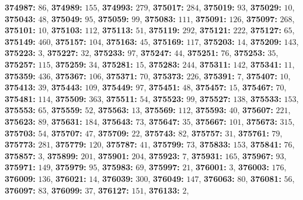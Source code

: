 \textsf{\bfseries 374987:} $86$, \textsf{\bfseries 374989:} $155$, \textsf{\bfseries 374993:} $279$, \textsf{\bfseries 375017:} $284$, \textsf{\bfseries 375019:} $93$, \textsf{\bfseries 375029:} $10$, \textsf{\bfseries 375043:} $48$, \textsf{\bfseries 375049:} $95$, \textsf{\bfseries 375059:} $99$, \textsf{\bfseries 375083:} $111$, \textsf{\bfseries 375091:} $126$, \textsf{\bfseries 375097:} $268$, \textsf{\bfseries 375101:} $10$, \textsf{\bfseries 375103:} $112$, \textsf{\bfseries 375113:} $51$, \textsf{\bfseries 375119:} $292$, \textsf{\bfseries 375121:} $222$, \textsf{\bfseries 375127:} $65$, \textsf{\bfseries 375149:} $460$, \textsf{\bfseries 375157:} $104$, \textsf{\bfseries 375163:} $45$, \textsf{\bfseries 375169:} $117$, \textsf{\bfseries 375203:} $14$, \textsf{\bfseries 375209:} $143$, \textsf{\bfseries 375223:} $3$, \textsf{\bfseries 375227:} $32$, \textsf{\bfseries 375233:} $97$, \textsf{\bfseries 375247:} $44$, \textsf{\bfseries 375251:} $76$, \textsf{\bfseries 375253:} $35$, \textsf{\bfseries 375257:} $115$, \textsf{\bfseries 375259:} $34$, \textsf{\bfseries 375281:} $15$, \textsf{\bfseries 375283:} $244$, \textsf{\bfseries 375311:} $142$, \textsf{\bfseries 375341:} $11$, \textsf{\bfseries 375359:} $436$, \textsf{\bfseries 375367:} $106$, \textsf{\bfseries 375371:} $70$, \textsf{\bfseries 375373:} $226$, \textsf{\bfseries 375391:} $7$, \textsf{\bfseries 375407:} $10$, \textsf{\bfseries 375413:} $39$, \textsf{\bfseries 375443:} $109$, \textsf{\bfseries 375449:} $97$, \textsf{\bfseries 375451:} $48$, \textsf{\bfseries 375457:} $15$, \textsf{\bfseries 375467:} $70$, \textsf{\bfseries 375481:} $114$, \textsf{\bfseries 375509:} $363$, \textsf{\bfseries 375511:} $54$, \textsf{\bfseries 375523:} $99$, \textsf{\bfseries 375527:} $138$, \textsf{\bfseries 375533:} $153$, \textsf{\bfseries 375553:} $65$, \textsf{\bfseries 375559:} $52$, \textsf{\bfseries 375563:} $13$, \textsf{\bfseries 375569:} $112$, \textsf{\bfseries 375593:} $40$, \textsf{\bfseries 375607:} $221$, \textsf{\bfseries 375623:} $89$, \textsf{\bfseries 375631:} $184$, \textsf{\bfseries 375643:} $73$, \textsf{\bfseries 375647:} $35$, \textsf{\bfseries 375667:} $101$, \textsf{\bfseries 375673:} $315$, \textsf{\bfseries 375703:} $54$, \textsf{\bfseries 375707:} $47$, \textsf{\bfseries 375709:} $22$, \textsf{\bfseries 375743:} $82$, \textsf{\bfseries 375757:} $31$, \textsf{\bfseries 375761:} $79$, \textsf{\bfseries 375773:} $281$, \textsf{\bfseries 375779:} $120$, \textsf{\bfseries 375787:} $41$, \textsf{\bfseries 375799:} $73$, \textsf{\bfseries 375833:} $153$, \textsf{\bfseries 375841:} $76$, \textsf{\bfseries 375857:} $3$, \textsf{\bfseries 375899:} $201$, \textsf{\bfseries 375901:} $204$, \textsf{\bfseries 375923:} $7$, \textsf{\bfseries 375931:} $165$, \textsf{\bfseries 375967:} $93$, \textsf{\bfseries 375971:} $149$, \textsf{\bfseries 375979:} $95$, \textsf{\bfseries 375983:} $69$, \textsf{\bfseries 375997:} $21$, \textsf{\bfseries 376001:} $3$, \textsf{\bfseries 376003:} $176$, \textsf{\bfseries 376009:} $136$, \textsf{\bfseries 376021:} $14$, \textsf{\bfseries 376039:} $300$, \textsf{\bfseries 376049:} $147$, \textsf{\bfseries 376063:} $80$, \textsf{\bfseries 376081:} $56$, \textsf{\bfseries 376097:} $83$, \textsf{\bfseries 376099:} $37$, \textsf{\bfseries 376127:} $151$, \textsf{\bfseries 376133:} $2$, 
